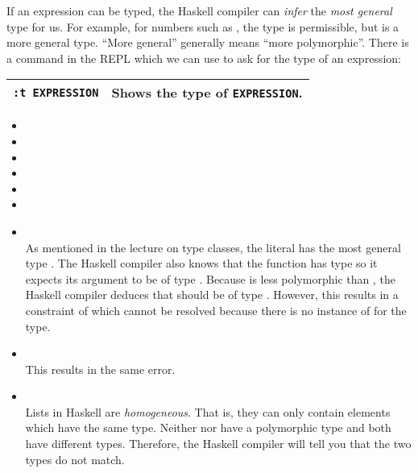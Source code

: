 If an expression can be typed, the Haskell compiler can \emph{infer} the \emph{most general} type for us. For example, for numbers such as , the  type is permissible, but  is a more general type. ``More general'' generally means ``more polymorphic''. There is a command in the REPL which we can use to ask for the type of an expression:
\begin{center}
\begin{tabular}{|l|l|}
	\hline 
	\texttt{\small :t EXPRESSION}   & Shows the type of \texttt{\small EXPRESSION}. \\ 
	\hline 
\end{tabular}  
\end{center}

\taskLine

\begin{itemize}
	\item {}
	\item {}
	\item \haskellIn{[1,2,3,4,5]}
	\item \haskellIn{[]}
	\item {}
	\item {}
\end{itemize}

\taskLine

\begin{itemize}
\item {} \\
As mentioned in the lecture on type classes, the literal  has the most general type . The Haskell compiler also knows that the  function has type  so it expects its argument to be of type . Because  is less polymorphic than , the Haskell compiler deduces that  should be of type . However, this results in a constraint of  which cannot be resolved because there is no instance of  for the  type.
\item \haskellIn{[1,True,3]} \\
This results in the same error.
\item \haskellIn{['a', False]} \\
Lists in Haskell are \emph{homogeneous}. That is, they can only contain elements which have the same type. Neither  nor  have a polymorphic type and both have different types. Therefore, the Haskell compiler will tell you that the two types do not match.
\end{itemize}

